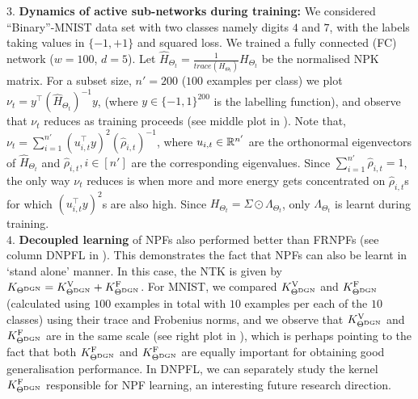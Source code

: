 $3.$ \textbf{Dynamics of active sub-networks during training:} We considered ``Binary''-MNIST data set with two classes namely digits $4$ and $7$, with the labels taking values in $\{-1,+1\}$ and squared loss. We trained a fully connected (FC) network ($w=100$, $d=5$). Let $\widehat{H}_{\Theta_t}=\frac{1}{trace(H_{\Theta_t})}H_{\Theta_t}$ be the normalised NPK matrix. For a subset size, $n'=200$ ($100$ examples per class) we plot $\nu_t=y^\top (\widehat{H}_{\Theta_t})^{-1} y$, (where $y\in\{-1,1\}^{200}$ is the labelling function), and observe that $\nu_t$ reduces as training proceeds (see middle plot in ). Note that, $\nu_t=\sum_{i=1}^{n'}(u_{i,t}^\top y)^2 (\hat{\rho}_{i,t})^{-1}$, where $u_{i,t}\in \mathbb{R}^{n'}$ are the orthonormal eigenvectors of $\widehat{H}_{\Theta_t}$ and $\hat{\rho}_{i,t},i\in[n']$ are the corresponding eigenvalues. Since $\sum_{i=1}^{n'}\hat{\rho}_{i,t}=1$, the only way $\nu_t$ reduces is when more and more energy gets concentrated on $\hat{\rho}_{i,t}$s for which $(u_{i,t}^\top y)^2$s are also high. Since $H_{\Theta_t}=\Sigma\odot \Lambda_{\Theta_t}$, only $\Lambda_{\Theta_t}$ is learnt during training.\\
$4.$ \textbf{Decoupled learning} of NPFs also performed better than FRNPFs (see column DNPFL in ). This demonstrates the fact that NPFs can also be learnt in `stand alone' manner. In this case, the NTK is given by $K_{\Theta^{\text{DGN}}}=K^{\text{V}}_{\Theta^{\text{DGN}}}+K^{\text{F}}_{\Theta^{\text{DGN}}}$. For MNIST, we compared $K^{\text{V}}_{\Theta^{\text{DGN}}}$ and $K^{\text{F}}_{\Theta^{\text{DGN}}}$ (calculated using $100$ examples in total with $10$ examples per each of the $10$ classes) using their trace and Frobenius norms, and we observe that $K^{\text{V}}_{\Theta^{\text{DGN}}}$ and $K^{\text{F}}_{\Theta^{\text{DGN}}}$ are in the same scale (see right plot in ), which is perhaps pointing to the fact that both $K^{\text{F}}_{\Theta^{\text{DGN}}}$ and $K^{\text{F}}_{\Theta^{\text{DGN}}}$ are equally important for obtaining good generalisation performance. In DNPFL, we can separately study the kernel $K^{\text{F}}_{\Theta^{\text{DGN}}}$ responsible for NPF learning, an interesting future research direction.
